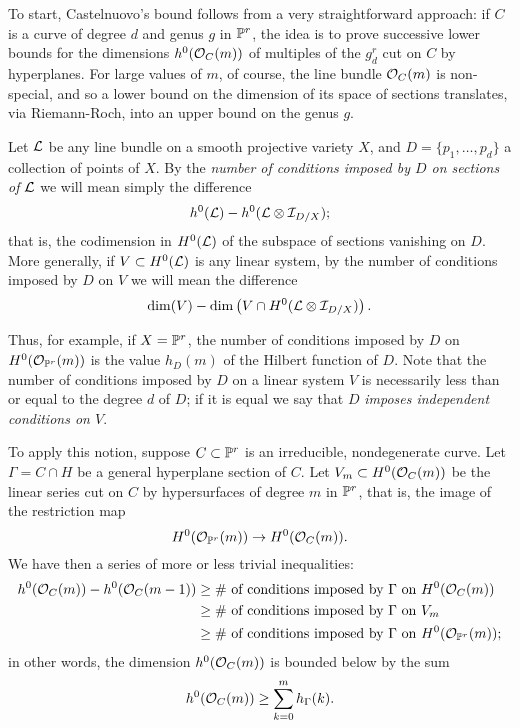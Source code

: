 To start, Castelnuovo's bound follows from a very straightforward approach: if $C$ is a curve of degree $d$ and genus $g$ in ${\mathbb P}^r$, the idea is to prove successive lower bounds for the dimensions $h^0({\mathcal O}_C(m))$ of multiples of the $g^r_d$ cut on $C$ by hyperplanes. For large values of $m$, of course, the line bundle ${\mathcal O}_C(m)$ is non-special, and so a lower bound on the dimension of its space of sections translates, via Riemann-Roch, into an upper bound on the genus $g$.

\begin{definition}
Let ${\mathcal L}$ be any line bundle on a smooth projective variety $X$, and $D = \{p_1,\dots,p_d\}$ a collection of points of $X$. By the \emph{number of conditions imposed by $D$ on sections of ${\mathcal L}$} we will mean simply the difference
$$
h^0({\mathcal L}) - h^0({\mathcal L} \otimes {\mathcal I}_{D/X});
$$
that is, the codimension in $H^0({\mathcal L})$ of the subspace of sections vanishing on $D$. More generally, if $V \subset H^0({\mathcal L})$ is any linear system, by the number of conditions imposed by $D$ on $V$ we will mean the difference
$$
\dim(V) - \dim \left(V \cap H^0({\mathcal L}\otimes {\mathcal I}_{D/X}) \right).
$$
\end{definition}
Thus, for example, if $X = {\mathbb P}^r$, the number of conditions imposed by $D$ on $H^0({\mathcal O}_{{\mathbb P}^r}(m))$ is the value $h_D(m)$ of the Hilbert function of $D$.
Note that the number of conditions imposed by $D$ on a linear system $V$ is necessarily less than or equal to the degree $d$ of $D$; if it is equal we say that $D$ \emph{imposes independent conditions on $V$}.

To apply this notion, suppose $C \subset {\mathbb P}^r$ is an irreducible, nondegenerate curve. Let $\Gamma = C \cap H$ be a general hyperplane section of $C$. Let $V_m \subset H^0({\mathcal O}_C(m))$ be the linear series cut on $C$ by hypersurfaces of degree $m$ in ${\mathbb P}^r$, that is, the image of the restriction map
$$
H^0({\mathcal O}_{{\mathbb P}^r}(m)) \to H^0({\mathcal O}_C(m)).
$$
We have then a series of more or less trivial inequalities:
\begin{align*}
h^0({\mathcal O}_C(m)) - h^0({\mathcal O}_C(m-1)) & \geq \text{\# of conditions imposed by $\Gamma$ on $H^0({\mathcal O}_C(m))$} \\
&\geq \text{\# of conditions imposed by $\Gamma$ on $V_m$} \\
&\geq \text{\# of conditions imposed by $\Gamma$ on $H^0({\mathcal O}_{{\mathbb P}^r}(m))$} ;
\end{align*}
in other words, the dimension $h^0({\mathcal O}_C(m))$ is bounded below by the sum
$$
h^0({\mathcal O}_C(m)) \geq \sum_{k=0}^m h_\Gamma(k).
$$

